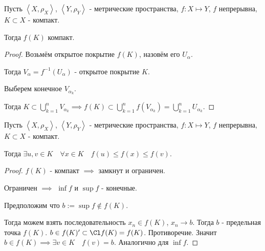 
\begin{theorem} \thmslashn

    Пусть $\left<X, \rho_{X}\right>$, $\left<Y, \rho_{Y}\right>$ - метрические пространства, $f : X \mapsto Y$, $f$ непрерывна, $K \subset X$ - компакт.

    Тогда $f(K)$ компакт.

    \begin{proof} \thmslashn
    
        Возьмём открытое покрытие $f(K)$, назовём его $U_{\alpha}$.

        Тогда $V_{\alpha} = f^{-1}(U_{\alpha})$ - открытое покрытие $K$.

        Выберем конечное $V_{\alpha_{k}}$.

        Тогда $K \subset \bigcup\limits_{k=1}^{n} V_{\alpha_{k}} \implies f(K) \subset \bigcup\limits_{k=1}^{n} f(V_{\alpha_{k}}) = \bigcup\limits_{k=1}^{n} U_{\alpha_{k}}   $.
    \end{proof}
\end{theorem}
\begin{theorem}[Вейерштрасса] \thmslashn

    Пусть $\left<X, \rho_{X}\right>$, $\left<Y, \rho_{Y}\right>$ - метрические пространства, $f : X \mapsto Y$, $f$ непрерывна, $K \subset X$ - компакт.

    Тогда $\exists{u, v\in K}\quad \forall{x\in K}\quad f(u) \le f(x) \le f(v)$.
    \begin{proof} \thmslashn
    
        $f(K)$ - компакт $\implies$ замкнут и ограничен.

        Ограничен $\implies$ $\inf f$ и $\sup f$ - конечные.

        Предположим что $b := \sup f \not\in f(K)$.

        Тогда можем взять последовательность $x_{n}\in f(K)$, $x_{n} \to b$. Тогда $b$ - предельная точка $f(K)$. $b\in f(K)' \subset \Cl f(K) = f(K)$. Противоречие. Значит $b\in f(K) \implies \exists{v\in K}\quad f(v) = b$. Аналогично для $\inf f$.
    \end{proof}
\end{theorem}

